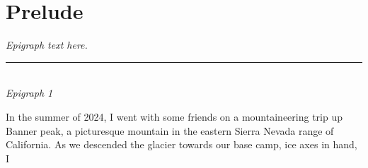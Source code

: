 \chapter*{Prelude}

\begin{flushleft}
	\emph{Epigraph text here.}\\
	\rule[0pt]{15em}{0.5pt}\\
	\emph{Epigraph 1}
\end{flushleft}

\vspace{2em}

In the summer of 2024, I went with some friends on a mountaineering trip up Banner peak, a picturesque mountain in the eastern Sierra Nevada range of California. 
As we descended the glacier towards our base camp, ice axes in hand, I 
